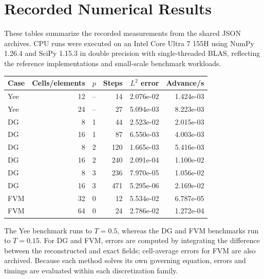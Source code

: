 \section{Recorded Numerical Results}
These tables summarize the recorded measurements from the shared JSON archives. CPU runs were executed on an Intel Core Ultra 7 155H using NumPy 1.26.4 and SciPy 1.15.3 in double precision with single-threaded BLAS, reflecting the reference implementations and small-scale benchmark workloads.
\begin{center}\small\begin{tabular}{lrrrrr}\toprule
Case & Cells/elements & $p$ & Steps & $L^2$ error & Advance/s\\\midrule
Yee & 12 & -- & 14 & 2.076e-02 & 1.424e-03\\
Yee & 24 & -- & 27 & 5.094e-03 & 8.223e-03\\
DG & 8 & 1 & 44 & 2.523e-02 & 2.015e-03\\
DG & 16 & 1 & 87 & 6.550e-03 & 4.003e-03\\
DG & 8 & 2 & 120 & 1.665e-03 & 5.416e-03\\
DG & 16 & 2 & 240 & 2.091e-04 & 1.100e-02\\
DG & 8 & 3 & 236 & 7.970e-05 & 1.056e-02\\
DG & 16 & 3 & 471 & 5.295e-06 & 2.169e-02\\
FVM & 32 & 0 & 12 & 5.534e-02 & 6.787e-05\\
FVM & 64 & 0 & 24 & 2.786e-02 & 1.272e-04\\
\bottomrule\end{tabular}\end{center}
The Yee benchmark runs to $T=0.5$, whereas the DG and FVM benchmarks run to $T=0.15$. For DG and FVM, errors are computed by integrating the difference between the reconstructed and exact fields; cell-average errors for FVM are also archived. Because each method solves its own governing equation, errors and timings are evaluated within each discretization family.
